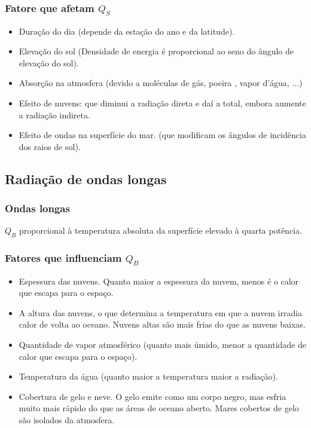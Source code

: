 \begin{frame}
  \frametitle{Fatore que afetam $Q_S$}
  \begin{itemize}[<+-| alert@+>]
    \item Duração do dia (depende da estação do ano e da latitude).
    \item Elevação do sol (Densidade de energia é proporcional ao seno do
          ângulo de elevação do sol).
    \item Absorção na atmosfera (devido a moléculas de gás, poeira , vapor
          d'água, ...)
    \item Efeito de nuvens: que diminui a radiação direta e daí a total,
          embora aumente a radiação indireta.
    \item Efeito de ondas na superfície do mar. (que modificam os ângulos de
          incidência dos raios de sol).
  \end{itemize}
\end{frame}

\subsection{Radiação de ondas longas}
\begin{frame}
  \frametitle{Ondas longas}
  \begin{block}{}
    $Q_B$ proporcional à temperatura absoluta da superfície elevado à
          quarta potência.
  \end{block}
\end{frame}

\begin{frame}
  \frametitle{Fatores que influenciam $Q_B$}
  {\footnotesize
  \begin{itemize}[<+-| alert@+>]
    \item Espessura das nuvens. Quanto maior a espessura da nuvem, menos é o
          calor que escapa para o espaço.
    \item A altura das nuvens, o que determina a temperatura em que a nuvem
          irradia calor de volta ao oceano. Nuvens altas são mais frias do que
          as nuvens baixas.
    \item Quantidade de vapor atmosférico (quanto mais úmido, menor a quantidade
          de calor que escapa para o espaço).
    \item Temperatura da água (quanto maior a temperatura maior a radiação).
    \item Cobertura de gelo e neve. O gelo emite como um corpo negro, mas esfria
          muito mais rápido do que as áreas de oceano aberto.  Mares cobertos de
          gelo são isolados da atmosfera.
  \end{itemize}
}
\end{frame}

